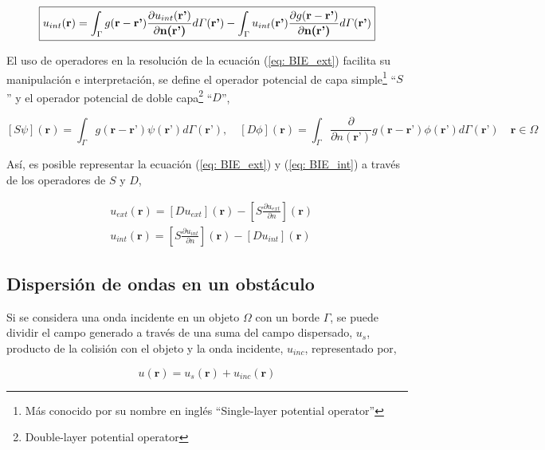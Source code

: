 \documentclass[12pt,letterpaper]{article}
\numberwithin{equation}{section}
\begin{document}
\begin{equation}
\boxed{
	u_{int}(\textbf{r})=\int_{\Gamma}g(\textbf{r}-\textbf{r'})\frac{\partial u_{int}(\textbf{r'})}{\partial\textbf{n(\textbf{r'})}}d\varGamma(\textbf{r'}) - \int_{\Gamma}u_{int}(\textbf{r'})\frac{\partial g(\textbf{r}-\textbf{r'})}{\partial\textbf{n(\textbf{r'})}}d\varGamma(\textbf{r'})
	\label{eq: BIE_int}
}	
\end{equation}

El uso de operadores en la resolución de la ecuación (\ref{eq: BIE_ext}) facilita su manipulación e interpretación, se define el operador potencial de capa simple\footnote{Más conocido por su nombre en inglés ``Single-layer potential operator''} ``$S$ '' y el operador potencial de doble capa\footnote{Double-layer potential operator} ``$D$'',

$$[S\psi](\textbf{r})=\int_{\Gamma}g(\textbf{r}-\textbf{r'})\psi(\textbf{r'}) d\varGamma(\textbf{r'}), \quad [D\phi](\textbf{r})=\int_{\Gamma}\frac{\partial}{\partial n(\textbf{r'})} g(\textbf{r}-\textbf{r'})\phi(\textbf{r'}) d\varGamma(\textbf{r'}) \quad \textbf{r}\in\Omega$$

Así, es posible representar la ecuación (\ref{eq: BIE_ext}) y (\ref{eq: BIE_int}) a través de los operadores de $S$ y $D$,

\begin{equation}
\begin{split}
	&u_{ext}(\textbf{r})=\left[D u_{ext}\right](\textbf{r}) - \left[S \frac{\partial u_{ext}}{\partial n}\right](\textbf{r})\\
	&u_{int}(\textbf{r})= \left[S \frac{\partial u_{int}}{\partial n}\right](\textbf{r}) - \left[D u_{int}\right](\textbf{r})
\end{split}
	\label{eq: BIE_potencial}
\end{equation}

\subsection{Dispersión de ondas en un obstáculo}

Si se considera una onda incidente en un objeto $\Omega$ con un borde $\Gamma$, se puede dividir el campo generado a través de una suma del campo dispersado, $u_s$, producto de la colisión con el objeto y la onda incidente, $u_{inc}$, representado por,

\begin{equation}
	u(\textbf{r})=u_s(\textbf{r})+u_{inc}(\textbf{r})
	\label{eq: separacion de onda}
\end{equation} 
\end{document}

